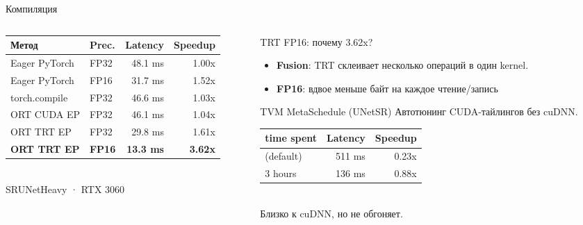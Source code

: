 \documentclass[aspectratio=169,11pt]{beamer}
\begin{document}
\begin{frame}{Компиляция}
  \begin{columns}[T]
    \begin{column}{0.52\textwidth}
      \footnotesize\renewcommand{\arraystretch}{1.18}
      \begin{tabular}{@{}llrr@{}}
        \toprule
        \textbf{Метод} & \textbf{Prec.} & \textbf{Latency} & \textbf{Speedup} \\
        \midrule
        Eager PyTorch       & FP32 & 48.1 ms & 1.00x \\
        Eager PyTorch       & FP16 & 31.7 ms & 1.52x \\
        torch.compile       & FP32 & 46.6 ms & 1.03x \\
        ORT CUDA EP         & FP32 & 46.1 ms & 1.04x \\
        \rowcolor{hlyellow}
        ORT TRT EP          & FP32 & 29.8 ms & 1.61x \\
        \rowcolor{hlgreen}
        \textbf{ORT TRT EP} & \textbf{FP16} & \textbf{13.3 ms} & \textbf{3.62x} \\
        \bottomrule
      \end{tabular}
      \vspace{0.3em}\\
      {\scriptsize SRUNetHeavy · RTX 3060}
    \end{column}
    \begin{column}{0.44\textwidth}
      \begin{alertblock}{TRT FP16: почему 3.62x?}
        \scriptsize
        \begin{itemize}\setlength{\itemsep}{1pt}
          \item \textbf{Fusion}: TRT склеивает несколько операций в один kernel.
          \item \textbf{FP16}: вдвое меньше байт на каждое чтение/запись
        \end{itemize}
      \end{alertblock}
      \vspace{0.2em}
      \begin{block}{TVM MetaSchedule (UNetSR)}
        \scriptsize
        Автотюнинг CUDA-тайлингов без cuDNN.\\[0.2em]
        \renewcommand{\arraystretch}{1.1}
        \begin{tabular}{@{}lrr@{}}
          \toprule
          time spent & Latency & Speedup \\
          \midrule
          (default)  & 511 ms & 0.23x \\
          3 hours & 136 ms & 0.88x \\
          \bottomrule
        \end{tabular}
        \vspace{0.2em}\\
        Близко к cuDNN, но не обгоняет.
      \end{block}
    \end{column}
  \end{columns}
\end{frame}
\end{document}
